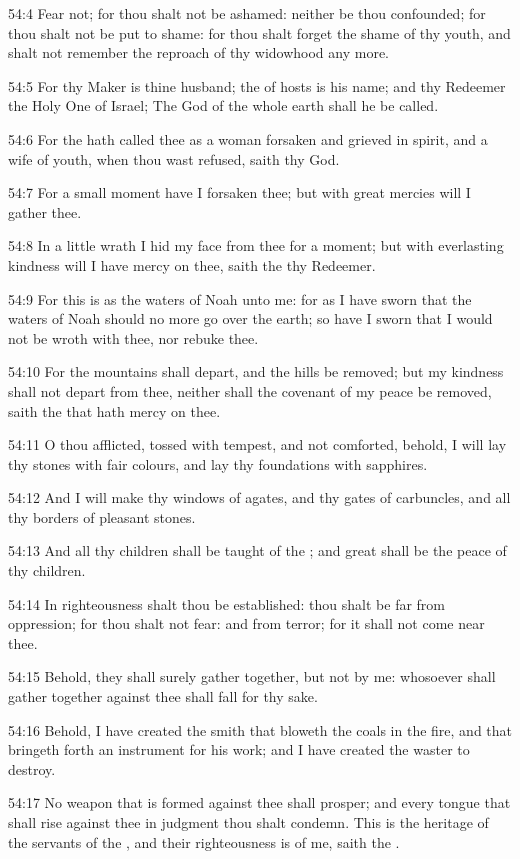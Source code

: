 54:4 Fear not; for thou shalt not be ashamed: neither be thou
confounded; for thou shalt not be put to shame: for thou shalt forget
the shame of thy youth, and shalt not remember the reproach of thy
widowhood any more.

54:5 For thy Maker is thine husband; the \LORD of hosts is his name;
and thy Redeemer the Holy One of Israel; The God of the whole earth
shall he be called.

54:6 For the \LORD hath called thee as a woman forsaken and grieved in
spirit, and a wife of youth, when thou wast refused, saith thy God.

54:7 For a small moment have I forsaken thee; but with great mercies
will I gather thee.

54:8 In a little wrath I hid my face from thee for a moment; but with
everlasting kindness will I have mercy on thee, saith the \LORD thy
Redeemer.

54:9 For this is as the waters of Noah unto me: for as I have sworn
that the waters of Noah should no more go over the earth; so have I
sworn that I would not be wroth with thee, nor rebuke thee.

54:10 For the mountains shall depart, and the hills be removed; but my
kindness shall not depart from thee, neither shall the covenant of my
peace be removed, saith the \LORD that hath mercy on thee.

54:11 O thou afflicted, tossed with tempest, and not comforted,
behold, I will lay thy stones with fair colours, and lay thy
foundations with sapphires.

54:12 And I will make thy windows of agates, and thy gates of
carbuncles, and all thy borders of pleasant stones.

54:13 And all thy children shall be taught of the \LORD; and great
shall be the peace of thy children.

54:14 In righteousness shalt thou be established: thou shalt be far
from oppression; for thou shalt not fear: and from terror; for it
shall not come near thee.

54:15 Behold, they shall surely gather together, but not by me:
whosoever shall gather together against thee shall fall for thy sake.

54:16 Behold, I have created the smith that bloweth the coals in the
fire, and that bringeth forth an instrument for his work; and I have
created the waster to destroy.

54:17 No weapon that is formed against thee shall prosper; and every
tongue that shall rise against thee in judgment thou shalt condemn.
This is the heritage of the servants of the \LORD, and their
righteousness is of me, saith the \LORD.

